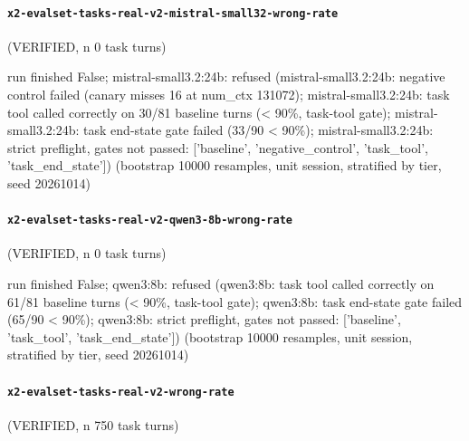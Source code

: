 \paragraph{\texttt{x2-evalset-tasks-real-v2-mistral-small32-wrong-rate}} (VERIFIED, n 0 task turns)

{\footnotesize\raggedright run finished False; mistral-small3.2:24b: refused (mistral-small3.2:24b: negative control failed (canary misses 16 at num\_ctx 131072); mistral-small3.2:24b: task tool called correctly on 30/81 baseline turns (\textless{} 90\%, task-tool gate); mistral-small3.2:24b: task end-state gate failed (33/90 \textless{} 90\%); mistral-small3.2:24b: strict preflight, gates not passed: ['baseline', 'negative\_control', 'task\_tool', 'task\_end\_state']) (bootstrap 10000 resamples, unit session, stratified by tier, seed 20261014)\par}

\paragraph{\texttt{x2-evalset-tasks-real-v2-qwen3-8b-wrong-rate}} (VERIFIED, n 0 task turns)

{\footnotesize\raggedright run finished False; qwen3:8b: refused (qwen3:8b: task tool called correctly on 61/81 baseline turns (\textless{} 90\%, task-tool gate); qwen3:8b: task end-state gate failed (65/90 \textless{} 90\%); qwen3:8b: strict preflight, gates not passed: ['baseline', 'task\_tool', 'task\_end\_state']) (bootstrap 10000 resamples, unit session, stratified by tier, seed 20261014)\par}

\paragraph{\texttt{x2-evalset-tasks-real-v2-wrong-rate}} (VERIFIED, n 750 task turns)

